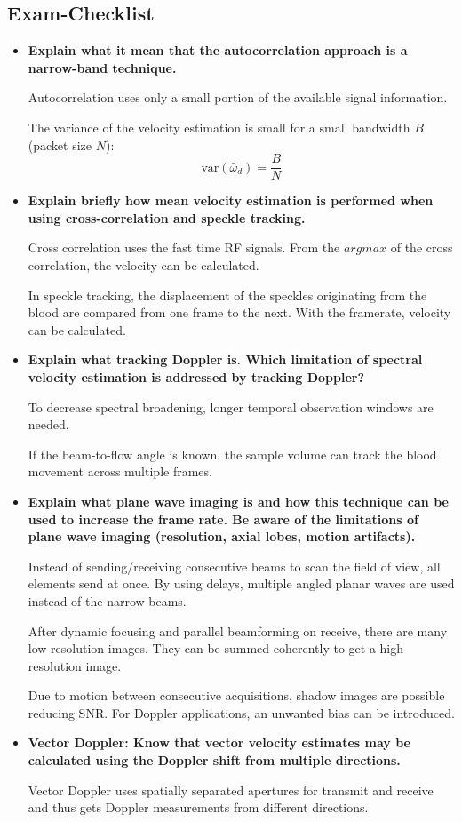 \documentclass[10pt,a4paper,noendnumber=true]{scrartcl}
\begin{document}
\subsection{Exam-Checklist}
\begin{itemize}
\item \textbf{Explain what it mean that the autocorrelation approach is a narrow-band technique.}

Autocorrelation uses only a small portion of the available signal information.

The variance of the velocity estimation is small for a small bandwidth $B$ (packet size $N$):
\begin{equation}
\text{var}(\bar{\omega}_d) = \frac{B}{N}
\end{equation}

\item \textbf{Explain briefly how mean velocity estimation is performed when using cross-correlation and speckle tracking.}

Cross correlation uses the fast time RF signals. From the $arg max$ of the cross correlation, the velocity can be calculated.

In speckle tracking, the displacement of the speckles originating from the blood are compared from one frame to the next. With the framerate, velocity can be calculated.

\item \textbf{Explain what tracking Doppler is. Which limitation of spectral velocity estimation is addressed by tracking Doppler?}

To decrease spectral broadening, longer temporal observation windows are needed.

If the beam-to-flow angle is known, the sample volume can track the blood movement across multiple frames.

\item \textbf{Explain what plane wave imaging is and how this technique can be used to increase the frame rate. Be aware of the limitations of plane wave imaging (resolution, axial lobes, motion artifacts).}

Instead of sending/receiving consecutive beams to scan the field of view, all elements send at once. By using delays, multiple angled planar waves are used instead of the narrow beams.

After dynamic focusing and parallel beamforming on receive, there are many low resolution images. They can be summed coherently to get a high resolution image.

Due to motion between consecutive acquisitions, shadow images are possible reducing SNR. For Doppler applications, an unwanted bias can be introduced.


\item \textbf{Vector Doppler: Know that vector velocity estimates may be calculated using the Doppler shift from multiple directions.}

Vector Doppler uses spatially separated apertures for transmit and receive and thus gets Doppler measurements from different directions.
\end{itemize}
\end{document}
